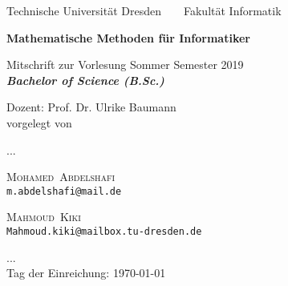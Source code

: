 \documentclass[a4paper,12pt]{report}
\makeatletter
\newcommand{\nameE}{Abdelshafi}
\newcommand{\vornameE}{Mohamed}
\newcommand{\emailE}{m.abdelshafi@mail.de}
\newcommand{\nameS}{Kiki}
\newcommand{\vornameS}{Mahmoud}
\newcommand{\emailS}{Mahmoud.kiki@mailbox.tu-dresden.de}
\theoremstyle{plain} %
\theoremstyle{break}
\newcommand{\thema}{Mathematische Methoden für Informatiker}
\newcommand{\datum}{\today}%
\makeatother
\begin{document}




	\thispagestyle{empty}


    \begin{center}
    {\Large
    Technische Universit\"{a}t Dresden\  \ \textbullet\ \ Fakult\"{a}t Informatik
    }

        \vfil

        {\bfseries\Huge\thema}

        \vfil

        {\LARGE
Mitschrift zur Vorlesung Sommer Semester 2019  \\[\bigskipamount]

        \bfseries{\itshape Bachelor of Science  \textup{(}B.Sc.\textup{)}}\\[\bigskipamount]
        }%

        \vfil\vfil\vfil
        Dozent: Prof. Dr. Ulrike Baumann \\
        vorgelegt von\\
        \item ... \\
        \item \textsc{\vornameE\ \nameE } \\ \texttt{\emailE} \\  \item
        \textsc{\vornameS\ \nameS \qquad } \\ \texttt{\emailS}  \\
        \item ... \\
        Tag der Einreichung: \datum\\[\bigskipamount]

    \end{center}


    \cleardoublepage



    \tableofcontents

    \thispagestyle{empty}



    \setcounter{page}{0}
\end{document}
